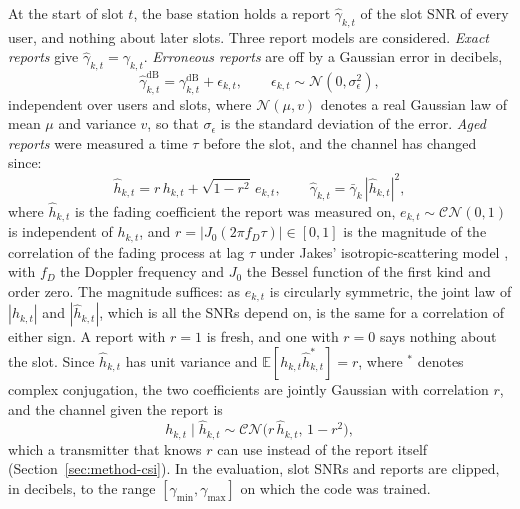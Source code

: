At the start of slot $t$, the base station holds a report $\hat\gamma_{k,t}$ of the slot SNR of
every user, and nothing about later slots. Three report models are considered.
\emph{Exact reports} give $\hat\gamma_{k,t} = \gamma_{k,t}$. \emph{Erroneous reports} are off by
a Gaussian error in decibels,
\begin{equation}
\hat\gamma^{\mathrm{dB}}_{k,t} = \gamma^{\mathrm{dB}}_{k,t} + \epsilon_{k,t}, \qquad
\epsilon_{k,t} \sim \mathcal{N}(0, \sigma_\epsilon^2),
\label{eq:cqi-error}
\end{equation}
independent over users and slots, where $\mathcal{N}(\mu, v)$ denotes a real Gaussian law of mean
$\mu$ and variance $v$, so that $\sigma_\epsilon$ is the standard deviation of the error.
\emph{Aged reports} were measured a time $\tau$ before the slot, and the channel has changed
since:
\begin{equation}
\hat h_{k,t} = r\, h_{k,t} + \sqrt{1 - r^2}\, e_{k,t}, \qquad
\hat\gamma_{k,t} = \bar\gamma_k\, |\hat h_{k,t}|^2,
\label{eq:aged}
\end{equation}
where $\hat h_{k,t}$ is the fading coefficient the report was measured on,
$e_{k,t} \sim \mathcal{CN}(0, 1)$ is independent of $h_{k,t}$, and
$r = |J_0(2\pi f_D \tau)| \in [0, 1]$ is the magnitude of the correlation of the fading process
at lag $\tau$ under Jakes' isotropic-scattering model \cite{Jakes94}, with $f_D$ the Doppler
frequency and $J_0$ the Bessel function of the first kind and order zero. The magnitude suffices:
as $e_{k,t}$ is circularly symmetric, the joint law of $|h_{k,t}|$ and $|\hat h_{k,t}|$, which is
all the SNRs depend on, is the same for a correlation of either sign. A report with $r = 1$ is
fresh, and one with $r = 0$ says nothing about the slot. Since $\hat h_{k,t}$ has unit
variance and $\mathbb{E}[h_{k,t} \hat h_{k,t}^*] = r$, where ${}^*$ denotes complex conjugation,
the two coefficients are jointly Gaussian with correlation $r$, and the channel given the report is
\begin{equation}
h_{k,t} \mid \hat h_{k,t} \sim \mathcal{CN}\big(r\, \hat h_{k,t},\, 1 - r^2\big),
\label{eq:posterior}
\end{equation}
which a transmitter that knows $r$ can use instead of the report itself
(Section~\ref{sec:method-csi}). In the evaluation, slot SNRs and reports are clipped, in
decibels, to the range $[\gamma_{\min}, \gamma_{\max}]$ on which the code was trained.

